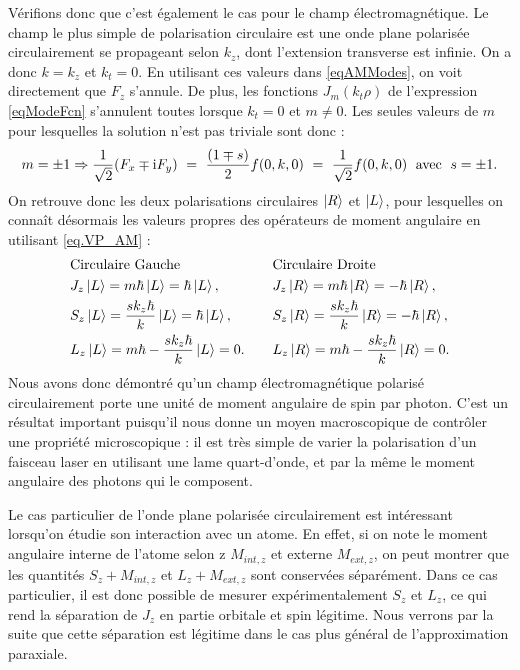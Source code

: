 Vérifions donc que c'est également le cas pour le champ électromagnétique. Le champ le plus simple de polarisation circulaire est une onde plane polarisée circulairement se propageant selon $k_z$, dont l'extension transverse est infinie. On a donc $k = k_z$ et $k_t = 0$. En utilisant ces valeurs dans \ref{eqAMModes}, on voit directement que $F_z$ s'annule. De plus, les fonctions $J_m(k_t\rho)$ de l'expression \ref{eqModeFcn} s'annulent toutes lorsque $k_t = 0$ et $m\neq 0$. Les seules valeurs de $m$ pour lesquelles la solution n'est pas triviale sont donc :
\begin{equation*}
m=\pm 1 \Rightarrow \frac{1}{\sqrt{2}}(F_x\mp\mathrm{i} F_y) ~= ~\frac{(1\mp s)}{2}f(0,k,0) ~=~ \frac{1}{\sqrt{2}}f(0,k,0) \;\mbox{ avec }\; s=\pm 1.
\end{equation*}
On retrouve donc les deux polarisations circulaires $\ket{R}$ et $\ket{L}$, pour lesquelles on connaît désormais les valeurs propres des opérateurs de moment angulaire en utilisant \ref{eq.VP_AM} :
\begin{equation*}
\begin{aligned}[c]
&\text{Circulaire Gauche}\\
&J_z\ket{L} = m\hbar\ket{L} = \hbar\ket{L},\\
&S_z\ket{L} = \frac{sk_z\hbar}{k}\ket{L} = \hbar\ket{L},\\
&L_z\ket{L} = m\hbar-\frac{sk_z\hbar}{k}\ket{L} = 0.
\end{aligned}
\qquad
\begin{aligned}[c]
&\text{Circulaire Droite}\\
&J_z\ket{R} = m\hbar\ket{R} = -\hbar\ket{R},\\
&S_z\ket{R} = \frac{sk_z\hbar}{k}\ket{R} = -\hbar\ket{R},\\
&L_z\ket{R} = m\hbar-\frac{sk_z\hbar}{k}\ket{R} = 0.
\end{aligned}
\end{equation*}
Nous avons donc démontré qu'un champ électromagnétique polarisé circulairement porte une unité de moment angulaire de spin par photon. C'est un résultat important puisqu'il nous donne un moyen macroscopique de contrôler une propriété microscopique : il est très simple de varier la polarisation d'un faisceau laser en utilisant une lame quart-d'onde, et par la même le moment angulaire des photons qui le composent.

Le cas particulier de l'onde plane polarisée circulairement est intéressant lorsqu'on étudie son interaction avec un atome. En effet, si on note le moment angulaire interne de l'atome selon z $M_{int,z}$ et externe $M_{ext,z}$, on peut montrer que les quantités $S_z+M_{int,z}$ et $L_z+M_{ext,z}$ sont conservées séparément. Dans ce cas particulier, il est donc possible de mesurer expérimentalement $S_z$ et $L_z$, ce qui rend la séparation de $J_z$ en partie orbitale et spin légitime. Nous verrons par la suite que cette séparation est légitime dans le cas plus général de l'approximation paraxiale. 

